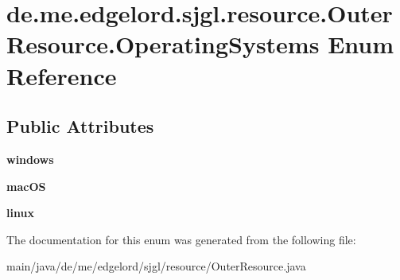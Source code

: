 \hypertarget{enumde_1_1me_1_1edgelord_1_1sjgl_1_1resource_1_1_outer_resource_1_1_operating_systems}{}\section{de.\+me.\+edgelord.\+sjgl.\+resource.\+Outer\+Resource.\+Operating\+Systems Enum Reference}
\label{enumde_1_1me_1_1edgelord_1_1sjgl_1_1resource_1_1_outer_resource_1_1_operating_systems}
\subsection*{Public Attributes}
\begin{DoxyCompactItemize}
\item 
\mbox{\label{enumde_1_1me_1_1edgelord_1_1sjgl_1_1resource_1_1_outer_resource_1_1_operating_systems_ae324723f7d1e2beb34e3aa167bcef04e}} 
{\bfseries windows}
\item 
\mbox{\label{enumde_1_1me_1_1edgelord_1_1sjgl_1_1resource_1_1_outer_resource_1_1_operating_systems_ad7c2015b8551548fe61e423af8d79657}} 
{\bfseries mac\+OS}
\item 
\mbox{\label{enumde_1_1me_1_1edgelord_1_1sjgl_1_1resource_1_1_outer_resource_1_1_operating_systems_a89f63cf173ef240d296c8de544b10a31}} 
{\bfseries linux}
\end{DoxyCompactItemize}


The documentation for this enum was generated from the following file\+:\begin{DoxyCompactItemize}
\item 
main/java/de/me/edgelord/sjgl/resource/Outer\+Resource.\+java\end{DoxyCompactItemize}
